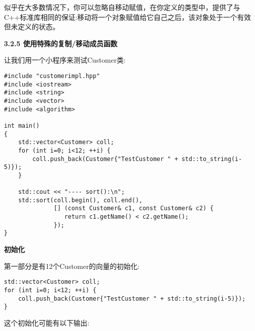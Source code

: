 似乎在大多数情况下，你可以忽略自移动赋值，在你定义的类型中，提供了与C++标准库相同的保证:移动将一个对象赋值给它自己之后，该对象处于一个有效但未定义的状态。\par

\hspace*{\fill} \par %
\textbf{3.2.5 使用特殊的复制/移动成员函数}

让我们用一个小程序来测试Customer类:\par

{\color{red}{basics/customerimpl.cpp}}

\begin{lstlisting}[caption={}]
#include "customerimpl.hpp"
#include <iostream>
#include <string>
#include <vector>
#include <algorithm>

int main()
{
	std::vector<Customer> coll;
	for (int i=0; i<12; ++i) {
		coll.push_back(Customer{"TestCustomer " + std::to_string(i-5)});
	}

	std::cout << "---- sort():\n";
	std::sort(coll.begin(), coll.end(),
			  [] (const Customer& c1, const Customer& c2) {
			     return c1.getName() < c2.getName();
			  });
}
\end{lstlisting}

\textbf{初始化}

第一部分是有12个Customer的向量的初始化:\par

\begin{lstlisting}[caption={}]
std::vector<Customer> coll;
for (int i=0; i<12; ++i) {
	coll.push_back(Customer{"TestCustomer " + std::to_string(i-5)});
}
\end{lstlisting}

这个初始化可能有以下输出:\par

